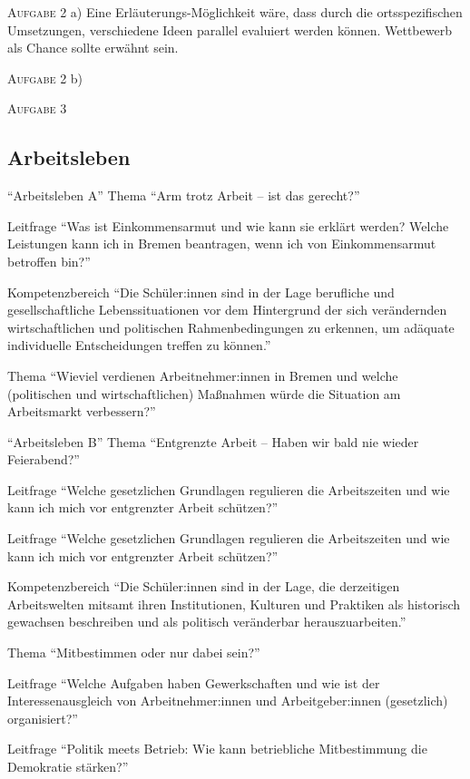 \textsc{Aufgabe 2} a) \quad
Eine Erläuterungs-Möglichkeit wäre, dass durch die ortsspezifischen Umsetzungen, verschiedene Ideen parallel evaluiert werden können. 
Wettbewerb als Chance sollte erwähnt sein. 

\textsc{Aufgabe 2} b) \quad


\textsc{Aufgabe 3} \quad



\subsection{Arbeitsleben}
\enquote{Arbeitsleben A} 
Thema
\enquote{Arm trotz Arbeit – ist das gerecht?}


Leitfrage
\enquote{Was ist Einkommensarmut und wie kann sie erklärt werden? Welche Leistungen kann ich in Bremen beantragen, wenn ich von Einkommensarmut betroffen bin?}

Kompetenzbereich
\enquote{Die Schüler:innen sind in der Lage berufliche und gesellschaftliche Lebenssituationen vor dem Hintergrund der sich verändernden wirtschaftlichen und politischen Rahmenbedingungen zu erkennen, um adäquate individuelle Entscheidungen treffen zu können.}


Thema
\enquote{Wieviel verdienen  Arbeitnehmer:innen in Bremen und welche (politischen und wirtschaftlichen) Maßnahmen würde die Situation am Arbeitsmarkt verbessern?}


\enquote{Arbeitsleben B}
Thema
\enquote{Entgrenzte Arbeit – Haben wir bald nie wieder Feierabend?}

Leitfrage
\enquote{Welche gesetzlichen Grundlagen regulieren die Arbeitszeiten und wie kann ich mich vor entgrenzter Arbeit schützen?}


Leitfrage
\enquote{Welche gesetzlichen Grundlagen regulieren die Arbeitszeiten und wie kann ich mich vor entgrenzter Arbeit schützen?}




Kompetenzbereich
\enquote{Die Schüler:innen sind in der Lage, die derzeitigen Arbeitswelten mitsamt ihren Institutionen, Kulturen und Praktiken als historisch gewachsen beschreiben und als politisch veränderbar herauszuarbeiten.}

Thema
\enquote{Mitbestimmen oder nur dabei sein?}

Leitfrage
\enquote{Welche Aufgaben haben Gewerkschaften und wie ist der Interessenausgleich von Arbeitnehmer:innen und Arbeitgeber:innen (gesetzlich) organisiert?}


Leitfrage
\enquote{Politik meets Betrieb: Wie kann betriebliche Mitbestimmung die Demokratie stärken?}





